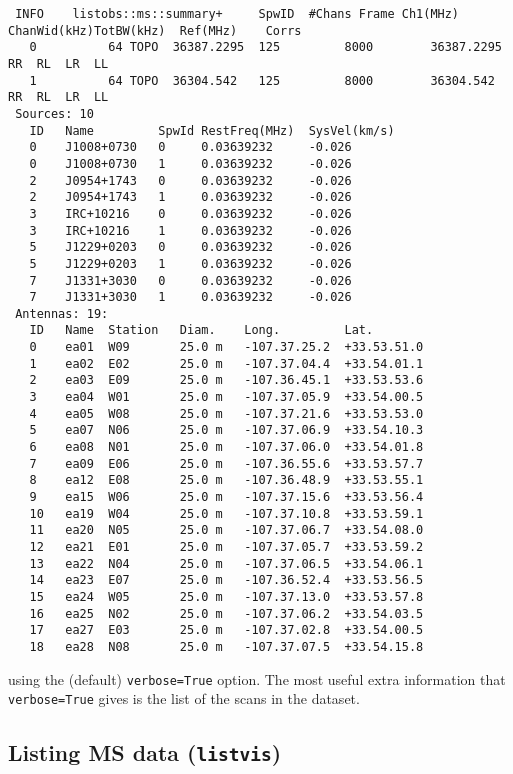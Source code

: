 \begin{verbatim}
 INFO    listobs::ms::summary+     SpwID  #Chans Frame Ch1(MHz)    ChanWid(kHz)TotBW(kHz)  Ref(MHz)    Corrs           
   0          64 TOPO  36387.2295  125         8000        36387.2295  RR  RL  LR  LL  
   1          64 TOPO  36304.542   125         8000        36304.542   RR  RL  LR  LL  
 Sources: 10
   ID   Name         SpwId RestFreq(MHz)  SysVel(km/s) 
   0    J1008+0730   0     0.03639232     -0.026       
   0    J1008+0730   1     0.03639232     -0.026       
   2    J0954+1743   0     0.03639232     -0.026       
   2    J0954+1743   1     0.03639232     -0.026       
   3    IRC+10216    0     0.03639232     -0.026       
   3    IRC+10216    1     0.03639232     -0.026       
   5    J1229+0203   0     0.03639232     -0.026       
   5    J1229+0203   1     0.03639232     -0.026       
   7    J1331+3030   0     0.03639232     -0.026       
   7    J1331+3030   1     0.03639232     -0.026       
 Antennas: 19:
   ID   Name  Station   Diam.    Long.         Lat.         
   0    ea01  W09       25.0 m   -107.37.25.2  +33.53.51.0  
   1    ea02  E02       25.0 m   -107.37.04.4  +33.54.01.1  
   2    ea03  E09       25.0 m   -107.36.45.1  +33.53.53.6  
   3    ea04  W01       25.0 m   -107.37.05.9  +33.54.00.5  
   4    ea05  W08       25.0 m   -107.37.21.6  +33.53.53.0  
   5    ea07  N06       25.0 m   -107.37.06.9  +33.54.10.3  
   6    ea08  N01       25.0 m   -107.37.06.0  +33.54.01.8  
   7    ea09  E06       25.0 m   -107.36.55.6  +33.53.57.7  
   8    ea12  E08       25.0 m   -107.36.48.9  +33.53.55.1  
   9    ea15  W06       25.0 m   -107.37.15.6  +33.53.56.4  
   10   ea19  W04       25.0 m   -107.37.10.8  +33.53.59.1  
   11   ea20  N05       25.0 m   -107.37.06.7  +33.54.08.0  
   12   ea21  E01       25.0 m   -107.37.05.7  +33.53.59.2  
   13   ea22  N04       25.0 m   -107.37.06.5  +33.54.06.1  
   14   ea23  E07       25.0 m   -107.36.52.4  +33.53.56.5  
   15   ea24  W05       25.0 m   -107.37.13.0  +33.53.57.8  
   16   ea25  N02       25.0 m   -107.37.06.2  +33.54.03.5  
   17   ea27  E03       25.0 m   -107.37.02.8  +33.54.00.5  
   18   ea28  N08       25.0 m   -107.37.07.5  +33.54.15.8 
\end{verbatim}
\normalsize
using the (default) {\tt verbose=True} option.
The most useful extra information that {\tt verbose=True} gives
is the list of the scans in the dataset.

\subsection{Listing MS data ({\tt listvis})}
\label{section:io.vis.listvis}

